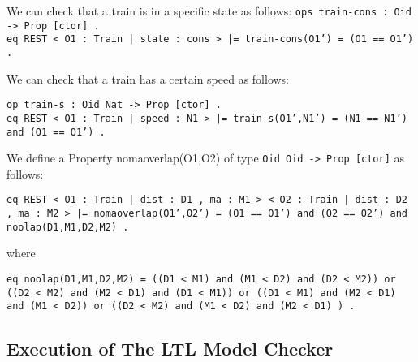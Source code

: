 We can check that a train is in a specific state as follows:
\texttt{ops train-cons : Oid -> Prop [ctor] .} \\ \medskip
\texttt{eq {REST < O1 : Train | state : cons >} |= train-cons(O1') = (O1 == O1') . } \\
\bigskip

We can check that a train has a certain speed as follows:

\texttt{op train-s : Oid Nat -> Prop [ctor] .} \\ \medskip
\texttt{eq {REST < O1 : Train | speed : N1 >} |= train-s(O1',N1') = (N1 == N1') and (O1 == O1') .}

We define a Property nomaoverlap(O1,O2) of type \texttt{Oid Oid -> Prop [ctor]} as follows: 

\begin{center}
\texttt{eq {REST < O1 : Train |  dist : D1 , ma : M1 > < O2 : Train |  dist : D2 , ma : M2 >} |= nomaoverlap(O1',O2') = (O1 == O1') and (O2 == O2') and noolap(D1,M1,D2,M2) .} 
\end{center}

where 

\begin{center}
\texttt{eq noolap(D1,M1,D2,M2) = ((D1 < M1) and (M1 < D2) and (D2 < M2)) or ((D2 < M2) and (M2 < D1) and (D1 < M1)) or ((D1 < M1) and (M2 < D1) and (M1 < D2)) or ((D2 < M2) and (M1 < D2) and (M2 < D1) )  .}    
\end{center}




\subsection{Execution of The LTL Model Checker}
